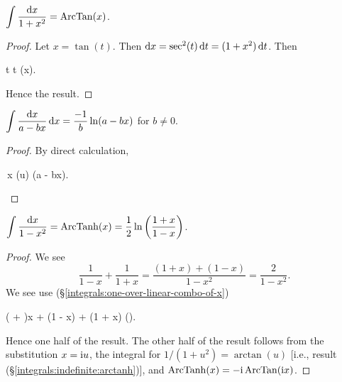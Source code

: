\M\label{integrals:indefinite:arctanh} $\displaystyle{\int\frac{\mathrm{d}x}{1 + x^{2}} = \operatorname{ArcTan}(x)}$.

\begin{proof}
Let $x=\tan(t)$. Then $\mathrm{d} x = \sec^{2}(t)\,\mathrm{d} t = (1 + x^{2})\,\mathrm{d} t$.
Then
\begin{calculation}
  \int{}
  \int\D t
  t
  \arctan(x).
\end{calculation}
Hence the result.
\end{proof}

\M\label{integrals:one-over-linear-combo-of-x} $\displaystyle{\int\frac{\mathrm{d}x}{a - bx}\,\mathrm{d}x = \frac{-1}{b}\ln(a - bx)}$ for $b\neq0$.

\begin{proof}
By direct calculation,
\begin{calculation}
  \int{}\,\D x
  \int{}
  \ln(u)
  \ln(a - bx).\qedhere
\end{calculation}
\end{proof}

\M $\displaystyle{\int\frac{\mathrm{d}x}{1 - x^{2}} = \operatorname{ArcTanh}(x) = \frac{1}{2}\ln\left(\frac{1+x}{1-x}\right)}$.

\begin{proof}
  We see
\begin{equation}\label{eq:integrals:indefinite:arctanh:intermediate-step}
\frac{1}{1 - x} + \frac{1}{1 + x}
= \frac{(1 + x) + (1 - x)}{1 - x^{2}}
= \frac{2}{1 - x^{2}}.
\end{equation}
We see use (\S\ref{integrals:one-over-linear-combo-of-x}) 
\begin{calculation}
  \int{}
  \int{}\left( + \right)\D x
  \int{} + \int{}
  \ln(1 - x) + \ln(1 + x)
  \ln\left(\right).
\end{calculation}
Hence one half of the result. The other half of the result follows from
the substitution $x=\mathrm{i} u$, the integral for $1/(1+u^{2})=\arctan(u)$
[i.e., result (\S\ref{integrals:indefinite:arctanh})],
and $\operatorname{ArcTanh}(x)=-\mathrm{i}\operatorname{ArcTan}(\mathrm{i} x)$.
\end{proof}

